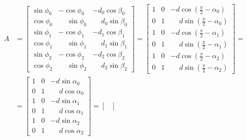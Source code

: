 \documentclass[11pt,a4paper]{article}
\begin{document}
\begin{equation}
    \begin{aligned}
        A & = \begin{bmatrix}
                  \sin\phi_0 & -\cos\phi_0           & -d_0\cos\beta_0           \\
                  \cos\phi_0 & \phantom{-}\sin\phi_0 & \phantom{-}d_0\sin\beta_0 \\
                  \sin\phi_1 & -\cos\phi_1           & -d_1\cos\beta_1           \\
                  \cos\phi_1 & \phantom{-}\sin\phi_1 & \phantom{-}d_1\sin\beta_1 \\
                  \sin\phi_2 & -\cos\phi_2           & -d_2\cos\beta_2           \\
                  \cos\phi_2 & \phantom{-}\sin\phi_2 & \phantom{-}d_2\sin\beta_2
              \end{bmatrix} = \begin{bmatrix}
                                  1 & 0 & -d\cos\left(\frac{\pi}{2}- \alpha_0\right)            \\
                                  0 & 1 & \phantom{-}d\sin\left(\frac{\pi}{2} - \alpha_0\right) \\
                                  1 & 0 & -d\cos\left(\frac{\pi}{2}-\alpha_1\right)             \\
                                  0 & 1 & \phantom{-}d\sin\left(\frac{\pi}{2}-\alpha_1\right)   \\
                                  1 & 0 & -d\cos\left(\frac{\pi}{2}-\alpha_2\right)             \\
                                  0 & 1 & \phantom{-}d\sin\left(\frac{\pi}{2}-\alpha_2\right)
                              \end{bmatrix}  = \\
          & = \begin{bmatrix}
                  1 & 0 & -d\sin\alpha_0           \\
                  0 & 1 & \phantom{-}d\cos\alpha_0 \\
                  1 & 0 & -d\sin\alpha_1           \\
                  0 & 1 & \phantom{-}d\cos\alpha_1 \\
                  1 & 0 & -d\sin\alpha_2           \\
                  0 & 1 & \phantom{-}d\cos\alpha_2
              \end{bmatrix} = \begin{bmatrix}

\end{bmatrix}
\end{aligned}
\end{equation}
\end{document}
